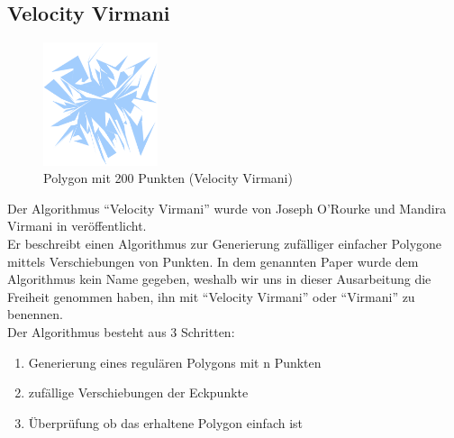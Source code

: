 \subsection{Velocity Virmani}

  \begin{figure}[h]
    \begin{center}
      \includegraphics[width=0.3\textwidth]{img/virmani200.eps}
    \end{center}
    \caption{Polygon mit 200 Punkten (Velocity Virmani)}
    \label{fig:virmani200}
  \end{figure}

  Der Algorithmus \enquote{Velocity Virmani} wurde von Joseph O'Rourke und Mandira 
  Virmani in \cite{virmani91polygons} veröffentlicht.\smallskip \\ 
  Er beschreibt einen Algorithmus zur Generierung zufälliger einfacher 
  Polygone mittels Verschiebungen von Punkten. In dem genannten Paper wurde 
  dem Algorithmus kein Name gegeben, weshalb wir uns in dieser Ausarbeitung
  die Freiheit genommen haben, ihn mit \enquote{Velocity Virmani} 
  oder \enquote{Virmani} zu benennen.
  \smallskip \\ 

  Der Algorithmus besteht aus 3 Schritten:
  \begin{enumerate}
    \item Generierung eines regulären Polygons mit n Punkten
    \item zufällige Verschiebungen der Eckpunkte
    \item Überprüfung ob das erhaltene Polygon einfach ist
  \end{enumerate}

